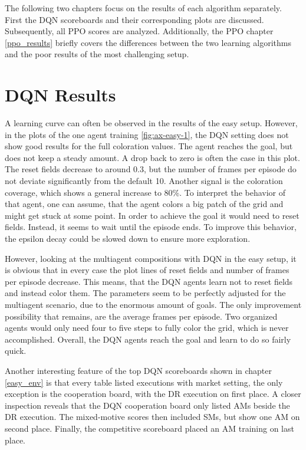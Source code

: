 The following two chapters focus on the results of each algorithm separately. First the DQN scoreboards and their corresponding plots are discussed. Subsequently, all PPO scores are analyzed. Additionally, the PPO chapter \ref{ppo_results} briefly covers the differences between the two learning algorithms and the poor results of the most challenging setup.

\section{DQN Results}
A learning curve can often be observed in the results of the easy setup. However, in the plots of the one agent training \ref{fig:ax-easy-1}, the DQN setting does not show good results for the full coloration values. The agent reaches the goal, but does not keep a steady amount. A drop back to zero is often the case in this plot. The reset fields decrease to around 0.3, but the number of frames per episode do not deviate significantly from the default 10. Another signal is the coloration coverage, which shows a general increase to 80\%. To interpret the behavior of that agent, one can assume, that the agent colors a big patch of the grid and might get stuck at some point. In order to achieve the goal it would need to reset fields. Instead, it seems to wait until the episode ends. To improve this behavior, the epsilon decay could be slowed down to ensure more exploration.

However, looking at the multiagent compositions with DQN in the easy setup, it is obvious that in every case the plot lines of reset fields and number of frames per episode decrease. This means, that the DQN agents learn not to reset fields and instead color them. The parameters seem to be perfectly adjusted for the multiagent scenario, due to the enormous amount of goals. The only improvement possibility that remains, are the average frames per episode. Two organized agents would only need four to five steps to fully color the grid, which is never accomplished. Overall, the DQN agents reach the goal and learn to do so fairly quick. 

Another interesting feature of the top DQN scoreboards shown in chapter \ref{easy_env} is that every table listed executions with market setting, the only exception is the cooperation board, with the DR execution on first place. A closer inspection reveals that the DQN cooperation board only listed AMs beside the DR execution. The mixed-motive scores then included SMs, but show one AM on second place. Finally, the competitive scoreboard placed an AM training on last place.

